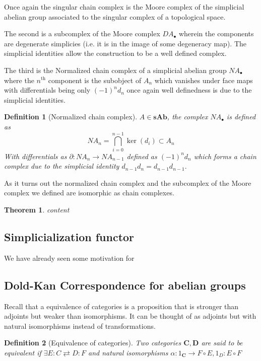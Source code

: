 \documentclass[12pt]{article}
\numberwithin{equation}{section}
\newtheorem{theorem}{Theorem}[section]
\newtheorem{definition}{Definition}[section]
\begin{document}
		Once again the singular chain complex is the Moore complex of the simplicial abelian group associated to the singular complex of a topological space.
	
	
	The second is a subcomplex of the Moore complex $DA_\bullet$ wherein the components are degenerate simplicies (i.e. it is in the image of some degeneracy map).	The simplicial identities allow the construction to be a well defined complex.
	
	The third is the Normalized chain complex of a simplicial abelian group $NA_\bullet$ where the $n^\text{th}$ component is the subobject of $A_n$ which vanishes under face maps with differentials being only $(-1)^n d_n$ once again well definedness is due to the simplicial identities.
	\begin{definition}[Normalized chain complex]
		$A \in \mathbf{sAb}$, the complex $NA_\bullet $ is defined as 
		\[ NA_n = \bigcap_{i=0}^{n-1} \ker(d_i) \subset A_n\]
		With differentials as $\partial: NA_n \to NA_{n-1}$ defined as $(-1)^n d_n$ which forms a chain complex due to the simplicial identity $d_{n-1}d_n=d_{n-1}d_{n-1}.$
	\end{definition}
	
	As it turns out the normalized chain complex and the subcomplex of the Moore complex we defined are isomorphic as chain complexes.
	
	\begin{theorem}
		content
	\end{theorem}
	\subsection{Simplicialization functor}
	We have already seen some motivation for 
	
	
	\subsection{Dold-Kan Correspondence for abelian groups}
	
	
	Recall that a equivalence of categories is a proposition that is stronger than adjoints but weaker than isomorphisms. It can be thought of as adjoints but with natural isomorphisms instead of transformations.
	\begin{definition}[Equivalence of categories]
		Two categories $\mathbf{C,D}$ are said to be equivalent if $\exists E:C \rightleftarrows D:F$ and natural isomorphisms $\alpha: 1_\mathbf{C} \to F\circ E, 1_D: E \circ F$
	\end{definition}
	
\end{document}
